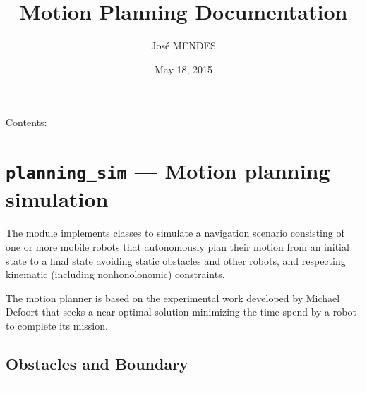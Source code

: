 \documentclass[letterpaper,10pt,english]{sphinxmanual}
\title{Motion Planning Documentation}
\date{May 18, 2015}
\author{José MENDES}
\begin{document}
\maketitle
\tableofcontents
{}\label{index::doc}


Contents:


\chapter{\texttt{planning\_sim} --- Motion planning simulation}
\label{Multi-robot motion planner:planning-sim-motion-planning-simulation}\label{Multi-robot motion planner::doc}\label{Multi-robot motion planner:logo-welcome-to-motion-planning-s-documentation}\label{Multi-robot motion planner:module-planning_sim}
The {\hyperref[Multi-robot motion planner:module-planning_sim]{}} module implements classes to simulate a navigation
scenario consisting of one or more mobile robots that autonomously plan their
motion from an initial state to a final state avoiding static obstacles and
other robots, and respecting kinematic (including nonhonolonomic) constraints.

The motion planner is based on the experimental work developed by Michael Defoort
that seeks a near-optimal solution minimizing the time spend by a robot to
complete its mission.


\section{Obstacles and Boundary}
\label{Multi-robot motion planner:obstacles-and-boundary}

\bigskip\hrule{}\bigskip

\end{document}
